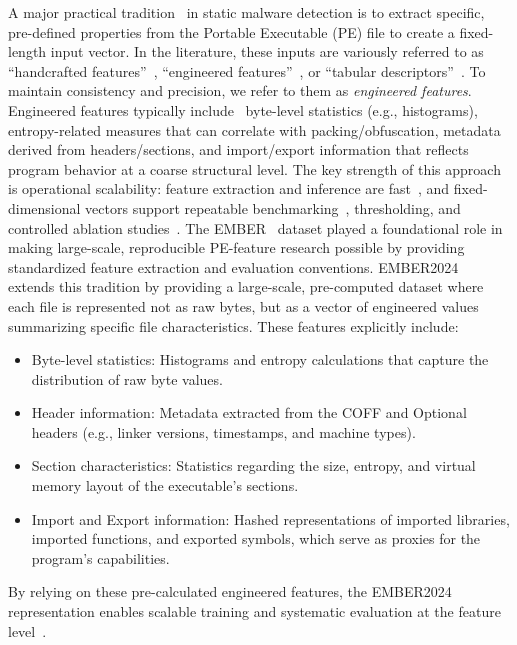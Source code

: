 \documentclass[conference]{IEEEtran}
\begin{document}
A major practical tradition~\cite{HP20182018} in static malware detection is to extract specific, pre-defined properties from the Portable Executable (PE) file to create a fixed-length input vector.
In the literature, these inputs are variously referred to as ``handcrafted features''~\cite{MT2025,EDS2020}, ``engineered features''~\cite{HP20182018}, or ``tabular descriptors''~\cite{JMGPR2024}.
To maintain consistency and precision, we refer to them as \emph{engineered features}.
Engineered features typically include~\cite{KBSSSK2025} byte-level statistics (e.g., histograms), entropy-related measures that can correlate with packing/obfuscation, metadata derived from headers/sections, and import/export information that reflects program behavior at a coarse structural level.
The key strength of this approach is operational scalability: feature extraction and inference are fast~\cite{EDS2020}, and fixed-dimensional vectors support repeatable benchmarking~\cite{JMGPR2024}, thresholding, and controlled ablation studies~\cite{AQPWPWCR2022}.
The EMBER~\cite{HP20182018} dataset played a foundational role in making large-scale, reproducible PE-feature research possible by providing standardized feature extraction and evaluation conventions.
EMBER2024~\cite{JMGPR2024} extends this tradition by providing a large-scale, pre-computed dataset where each file is represented not as raw bytes, but as a vector of engineered values summarizing specific file characteristics.
These features explicitly include:
\begin{itemize}
\item 
Byte-level statistics:
Histograms and entropy calculations that capture the distribution of raw byte values.
\item 
Header information: 
Metadata extracted from the COFF and Optional headers (e.g., linker versions, timestamps, and machine types).
\item 
Section characteristics: 
Statistics regarding the size, entropy, and virtual memory layout of the executable's sections.
\item
Import and Export information: 
Hashed representations of imported libraries, imported functions, and exported symbols, which serve as proxies for the program's capabilities.
\end{itemize}
By relying on these pre-calculated engineered features, the EMBER2024 representation enables scalable training and systematic evaluation at the feature level~\cite{JMGPR2024,HP20182018}.
\end{document}
